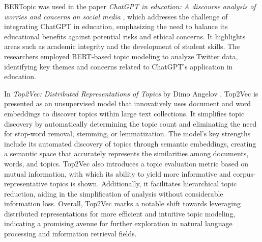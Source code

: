 \documentclass[fleqn,moreauthors,10pt]{ds_report}
\begin{document}
BERTopic was used in the paper \textit{ChatGPT in education: A discourse analysis of worries and
concerns on social media} \cite{li2023chatgpt}, which addresses the challenge of integrating ChatGPT in education, emphasizing the need to balance its educational benefits against potential risks and ethical concerns.  It highlights areas such as academic integrity and the development of student skills. The researchers employed BERT-based topic modeling to analyze Twitter data, identifying key themes and concerns related to ChatGPT's application in education. 

In \textit{Top2Vec: Distributed Representations of Topics} by Dimo Angelov \cite{angelov2020top2vec}, Top2Vec is presented as an unsupervised model that innovatively uses document and word embeddings to discover topics within large text collections. It simplifies topic discovery by automatically determining the topic count and eliminating the need for stop-word removal, stemming, or lemmatization. The model's key strengths include its automated discovery of topics through semantic embeddings, creating a semantic space that accurately represents the similarities among documents, words, and topics. Top2Vec also introduces a topic evaluation metric based on mutual information, with which its ability to yield more informative and corpus-representative topics is shown. Additionally, it facilitates hierarchical topic reduction, aiding in the simplification of analysis without considerable information loss. Overall, Top2Vec marks a notable shift towards leveraging distributed representations for more efficient and intuitive topic modeling, indicating a promising avenue for further exploration in natural language processing and information retrieval fields.
\end{document}
